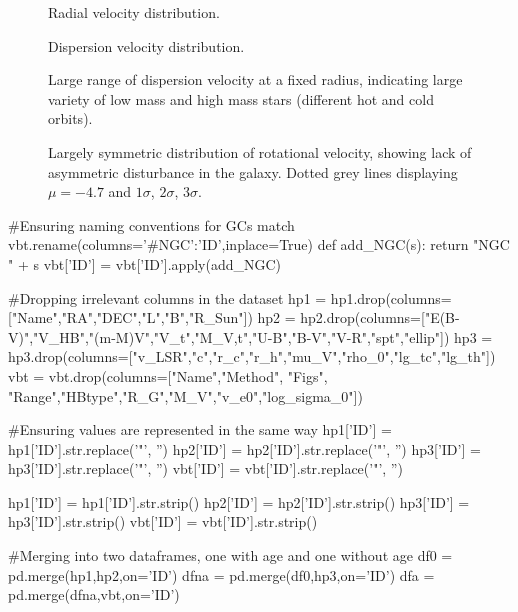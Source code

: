 \documentclass{article}
\begin{document}
\begin{figure} [H]
    \centering
    \scalebox{0.75}{}
    \caption{Radial velocity distribution.}
\end{figure}

\begin{figure} [H]
    \centering
    \scalebox{0.75}{}
    \caption{Dispersion velocity distribution.}
\end{figure}

\begin{figure} [H]
    \centering
    \scalebox{0.75}{}
    \caption{Large range of dispersion velocity at a fixed
    radius, indicating large variety of low mass and high 
    mass stars (different hot and cold orbits).}
\end{figure}

\begin{figure} [H]
    \centering
    \scalebox{0.75}{}
    \caption{Largely symmetric distribution of rotational 
    velocity, showing lack of asymmetric disturbance in 
    the galaxy. Dotted grey lines displaying $\mu = -4.7$
    and $1\sigma$, $2\sigma$, $3\sigma$.}
\end{figure}

\begin{python}

#Ensuring naming conventions for GCs match
vbt.rename(columns={'#NGC':'ID'},inplace=True)
def add_NGC(s):
    return "NGC " + s
vbt['ID'] = vbt['ID'].apply(add_NGC)

#Dropping irrelevant columns in the dataset
hp1 = hp1.drop(columns=["Name","RA","DEC","L","B","R_Sun"])
hp2 = hp2.drop(columns=["E(B-V)","V_HB","(m-M)V","V_t","M_V,t","U-B","B-V","V-R","spt","ellip"])
hp3 = hp3.drop(columns=["v_LSR","c","r_c","r_h","mu_V","rho_0","lg_tc","lg_th"])
vbt = vbt.drop(columns=["Name","Method", "Figs", "Range","HBtype","R_G","M_V","v_e0","log_sigma_0"])

#Ensuring values are represented in the same way
hp1['ID'] = hp1['ID'].str.replace('"', '')
hp2['ID'] = hp2['ID'].str.replace('"', '')
hp3['ID'] = hp3['ID'].str.replace('"', '')
vbt['ID'] = vbt['ID'].str.replace('"', '')

hp1['ID'] = hp1['ID'].str.strip()
hp2['ID'] = hp2['ID'].str.strip()
hp3['ID'] = hp3['ID'].str.strip()
vbt['ID'] = vbt['ID'].str.strip()

#Merging into two dataframes, one with age and one without age
df0 = pd.merge(hp1,hp2,on='ID')
dfna = pd.merge(df0,hp3,on='ID')
dfa = pd.merge(dfna,vbt,on='ID')
\end{python}
\end{document}
